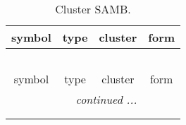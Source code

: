 \documentclass[fleqn,10pt,landscape]{article}
\begin{document}
\begin{itemize}
\begin{center}
\end{center}
\begin{center}
\renewcommand{\arraystretch}{1.3}
\begin{longtable}{c|c|c|c}
\caption{Cluster SAMB.}
 \\
 \hline \hline
symbol & type & cluster & form \\ \hline \endfirsthead

\multicolumn{3}{l}{\tablename\ \thetable{}} \\
 \hline \hline
symbol & type & cluster & form \\ \hline \endhead

 \hline \hline
\multicolumn{3}{r}{\footnotesize\it continued ...} \\ \endfoot

 \hline \hline
\multicolumn{3}{r}{} \\ \endlastfoot


\end{longtable}
\end{center}
\end{itemize}
\end{document}
